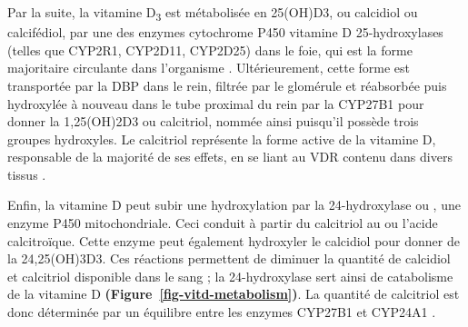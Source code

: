 \documentclass[
  a4paper,
  DIV=11,
  numbers=noendperiod,
  listof=totoc]{scrreprt}
\begin{document}
Par la suite, la vitamine D\textsubscript{3} est métabolisée en
\ac{25(OH)D3}, ou calcidiol ou calcifédiol, par une des enzymes
cytochrome P450 vitamine D 25-hydroxylases (telles que CYP2R1, CYP2D11,
CYP2D25) dans le foie, qui est la forme majoritaire circulante dans
l'organisme \autocite{Norman.2008,Christakos.2010}. Ultérieurement,
cette forme est transportée par la \ac{DBP} dans le rein, filtrée par le
glomérule et réabsorbée puis hydroxylée à nouveau dans le tube proximal
du rein par la \ac{CYP27B1} pour donner la \ac{1,25(OH)2D3} ou
calcitriol, nommée ainsi puisqu'il possède trois groupes hydroxyles. Le
calcitriol représente la forme active de la vitamine D, responsable de
la majorité de ses effets, en se liant au \ac{VDR} contenu dans divers
tissus \autocite{Norman.2008,Dankers.2017}.

Enfin, la vitamine D peut subir une hydroxylation par la 24-hydroxylase
ou , une enzyme P450 mitochondriale. Ceci conduit à partir
du calcitriol au  ou l'acide calcitroïque. Cette
enzyme peut également hydroxyler le calcidiol pour donner de la
\ac{24,25(OH)3D3}. Ces réactions permettent de diminuer la quantité de
calcidiol et calcitriol disponible dans le sang ; la 24-hydroxylase sert
ainsi de catabolisme de la vitamine D \autocite{Norman.2008}
\textbf{(Figure~\ref{fig-vitd-metabolism})}. La quantité de calcitriol
est donc déterminée par un équilibre entre les enzymes \ac{CYP27B1} et
\ac{CYP24A1} \autocite{Dankers.2017}.
\end{document}
